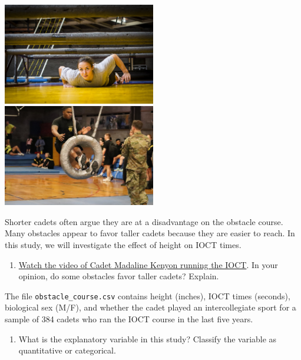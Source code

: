\documentclass[]{book}
\providecommand{\tightlist}{%
  \setlength{\itemsep}{0pt}\setlength{\parskip}{0pt}}
\begin{document}
\includegraphics[width=0.5\textwidth,height=\textheight]{./images/crawlObstacle.jpg} \includegraphics[width=0.5\textwidth,height=\textheight]{./images/tireObstacle.jpg}

Shorter cadets often argue they are at a disadvantage on the obstacle course. Many obstacles appear to favor taller cadets because they are easier to reach. In this study, we will investigate the effect of height on IOCT times.

\begin{enumerate}
\def\labelenumi{\arabic{enumi}.}
\tightlist
\item
  \href{https://www.youtube.com/watch?v=94tPO0fGtJo\&t=77s}{Watch the video of Cadet Madaline Kenyon running the IOCT}. In your opinion, do some obstacles favor taller cadets? Explain.
\end{enumerate}

\vspace{1in}

The file \texttt{obstacle\_course.csv} contains height (inches), IOCT times (seconds), biological sex (M/F), and whether the cadet played an intercollegiate sport for a sample of 384 cadets who ran the IOCT course in the last five years.

\begin{enumerate}
\def\labelenumi{\arabic{enumi}.}
\setcounter{enumi}{1}
\tightlist
\item
  What is the explanatory variable in this study? Classify the variable as quantitative or categorical.
\end{enumerate}

\vspace{0.25in}
\end{document}
